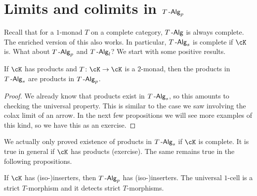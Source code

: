 \documentclass[a4paper,11pt,oneside,openany]{scrbook}
\begin{document}
\section{Limits and colimits in $T\operatorname{-\mathsf{Alg}}_p$}
Recall that for a $1$-monad $T$ on a complete category, $T\operatorname{-\mathsf{Alg}}$ is always complete. The enriched version of this also works. In particular, $T\operatorname{-\mathsf{Alg}}_s$ is complete if $\cK$ is. What about $T\operatorname{-\mathsf{Alg}}_p$ and $T\operatorname{-\mathsf{Alg}}_l$?
We start with some positive results.
\begin{prop}
    If $\cK$ has products and $T\colon\cK\to\cK$ is a $2$-monad, then the products in $T\operatorname{-\mathsf{Alg}}_s$ are products in $T\operatorname{-\mathsf{Alg}}_p$. 
\end{prop}
\begin{proof}
    We already know that products exist in $T\operatorname{-\mathsf{Alg}}_s$, so this amounts to checking the universal property. This is similar to the case we saw involving the colax limit of an arrow. In the next few propositions we will see more examples of this kind, so we have this as an exercise. 
\end{proof}
\begin{rmk}
We actually only proved existence of products in $T\operatorname{-\mathsf{Alg}}_s$ if $\cK$ is complete. It is true in general if $\cK$ has products (exercise). The same remains true in the following propositions.
\end{rmk}
\begin{prop}
    If $\cK$ has (iso-)inserters, then $T\operatorname{-\mathsf{Alg}}_p$ has (iso-)inserters. The universal $1$-cell is a strict $T$-morphism and it detects strict $T$-morphisms. 
\end{prop}
\end{document}
